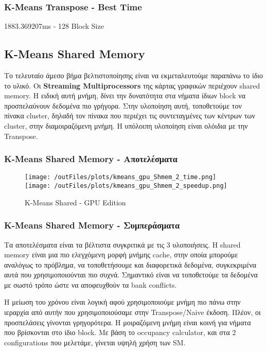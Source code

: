 \documentclass[../final_report.tex]{subfiles}
\begin{document}

\subsubsection*{K-Means Transpose - Best Time}
1883.369207ms - 128 Block Size

\subsection{K-Means Shared Memory}
Το τελευταίο άμεσο βήμα βελτιστοποίησης είναι να εκμεταλευτούμε παραπάνω το ίδιο το υλικό. Οι \textbf{Streaming Multiprocessors} της κάρτας
γραφικών περιέχουν shared memory. Η ειδική αυτή μνήμη, δίνει την δυνατότητα στα νήματα ίδιων block να προσπελαύνουν δεδομένα πιο γρήγορα. Στην υλοποίηση αυτή, τοποθετούμε
τον πίνακα cluster, δηλαδή τον πίνακα που περιέχει τις συντεταγμένες των κέντρων των cluster, στην διαμοιραζόμενη μνήμη. Η υπόλοιπη υλοποίηση
είναι ολόιδια με την Transpose.

\subsubsection*{K-Means Shared Memory - Αποτελέσματα}

\begin{figure}[H]
    \centering
    \texttt{[image: /outFiles/plots/kmeans\_gpu\_Shmem\_2\_time.png]}
    \texttt{[image: /outFiles/plots/kmeans\_gpu\_Shmem\_2\_speedup.png]}
    \caption{K-Means Shared - GPU Edition}
    \label{fig:K-Means Shared - GPU Edition}
\end{figure}

\subsubsection*{K-Means Shared Memory - Συμπεράσματα}
Τα αποτελέσματα είναι τα βέλτιστα συγκριτικά με τις 3 υλοποιήσεις. Η shared memory είναι μια πιο ελεγχόμενη μορφή μνήμης cache, στην οποία μπορούμε αναλόγως
το πρόβλημα, να τοποθετήσουμε και διαφορετικά δεδομένα, συγκεκριμένα αυτά που χρησιμοποιούνται πιο συχνά. Σημαντικό είναι να τοποθετούμε τα δεδομένα με σωστό τρόπο
ώστε να αποφευχθούν τα bank conflicts.

Η μείωση του χρόνου είναι λογική αφού χρησιμοποιούμε μνήμη πιο πάνω στην ιεραρχία από αυτήν που χρησιμοποιούσαμε στην Transpose/Naive έκδοση. Πλέον, οι προσπελάσεις
γίνονται γρηγορότερα. Η μοιραζόμενη μνήμη είναι κοινή για νήματα που βρίσκονται στο ίδιο block. Με βάση το occupancy calculator, και στα 2 configurations που μελετάμε,
γίνεται υψηλή χρήση των SM.
\end{document}
